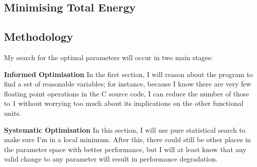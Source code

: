 \documentclass{article}
\begin{document}
\begin{multicols}{2}
  \section{Minimising Total Energy}
  \subsection{Methodology}
  My search for the optimal parameters will occur in two main stages:

  \textbf{Informed Optimisation} In the first section, I will reason about the program to find a set of reasonable variables; for instance, because I know there are very few floating point operations in the C source code, I can reduce the number of those to 1 without worrying too much about its implications on the other functional units.

  \textbf{Systematic Optimisation} In this section, I will use pure statistical search to make sure I'm in a local minimum. After this, there could still be other places in the parameter space with better performance, but I will at least know that any valid change to any parameter will result in performance degradation.





\end{multicols}
\end{document}
